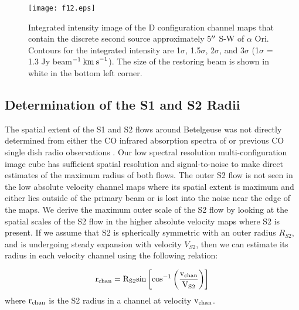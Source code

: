 \documentclass[iop]{emulateapj}
\begin{document}
\begin{figure}
\texttt{[image: f12.eps]}
\caption{Integrated intensity image of the D configuration channel maps that contain the discrete second source approximately 5$\mbox{$^{\prime\prime}$}$ S-W of $\alpha$ Ori. Contours for the integrated intensity are 1$\sigma$, 1.5$\sigma$, 2$\sigma$, and 3$\sigma$ (1$\sigma$ = 1.3 Jy beam${}^{-1}\>{\rm km\>s}^{-1}$). The size of the restoring beam is shown in white in the bottom left corner.}
\label{fig:fig4}
\end{figure}

\subsection{Determination of the S1 and S2 Radii} \label{results3} 
The spatial extent of the S1 and S2 flows around Betelgeuse was not directly determined from either the CO infrared absorption spectra of \cite{1979ApJ...233L.135B} or previous CO single dish radio observations \citep{1980ApJ...242L..25K, 1987ApJ...313..400H, 1994ApJ...424L.127H}. Our low spectral resolution multi-configuration image cube has sufficient spatial resolution and signal-to-noise to make direct estimates of the maximum radius of both flows. The outer S2 flow is not seen in the low absolute velocity channel maps where its spatial extent is maximum and either lies outside of the primary beam or is lost into the noise near the edge of the maps. We derive the maximum outer scale of the S2 flow by looking at the spatial scales of the S2 flow in the higher absolute velocity maps where S2 is present. If we assume that S2 is spherically symmetric with an outer radius $R_{S2}$, and is undergoing steady expansion with velocity $V_{S2}$, then we can estimate its radius in each velocity channel using the following relation:

\begin{equation}
\rm{r_{chan}}=R_{S2} \rm{sin}\left[\rm{cos}^{-1}\left(\frac{v_{chan}}{V_{S2}}\right) \right]
\end{equation} 
where $\rm{r_{chan}}$ is the S2 radius in a channel at velocity $\rm{v_{chan}}$. 
\end{document}
